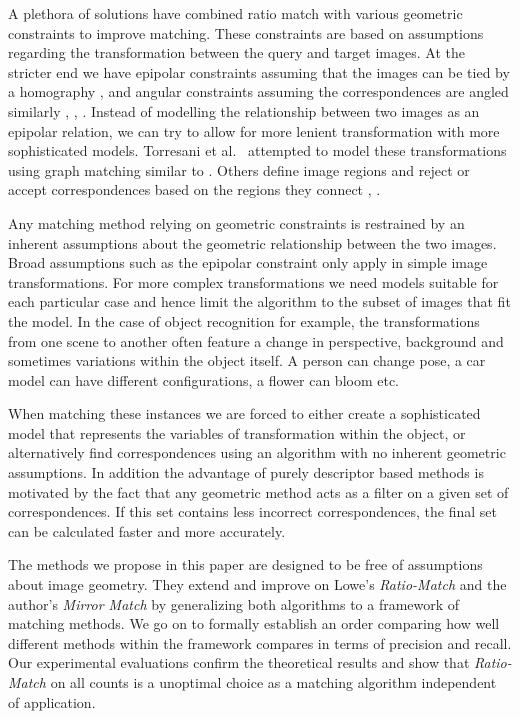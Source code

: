 \documentclass[journal]{IEEEtran}
\begin{document}
A plethora of solutions have combined ratio match with various geometric 
constraints to improve matching. These constraints are
based on assumptions regarding the transformation between the query and 
target images. At the stricter end we have epipolar constraints assuming
that the images can be tied by a homography \cite{torr2000mlesac}, 
\cite{chum2005matching} and angular constraints assuming the 
correspondences are angled similarly \cite{kim2008efficient}, 
\cite{schmid1997local}, \cite{leordeanu2005spectral}. Instead of 
modelling the relationship between two images as an epipolar relation, 
we can try to allow for more lenient transformation with more 
sophisticated models.  Torresani et al.~\cite{torresani2008feature} 
attempted to model these transformations using graph matching similar to 
\cite{deriche1994robust}. Others define image regions and reject or 
accept correspondences based on the regions they connect 
\cite{cho2009feature}, \cite{wu2011robust}.

Any matching method relying on geometric constraints is restrained by an
inherent assumptions about the geometric relationship between the two 
images. Broad assumptions such as the epipolar constraint only apply in 
simple image transformations. For more complex transformations we need 
models suitable for each particular case and hence limit the algorithm 
to the subset of images that fit the model.  In the case of object 
recognition for example, the transformations from one scene to another 
often feature a change
in perspective, background and sometimes variations within the object 
itself.  A person can change pose, a car model can have different 
configurations, a flower can bloom etc.

When matching these instances we are forced to either create a 
sophisticated model that represents the variables of transformation 
within the object, or alternatively find correspondences using an 
algorithm with no inherent geometric assumptions. In addition the 
advantage of purely descriptor based methods is motivated by the fact 
that any geometric method acts as a filter on a given set of 
correspondences.  If this set contains less incorrect correspondences, 
the final set can be calculated faster and more accurately.

The methods we propose in this paper are designed to be free of 
assumptions about image geometry. They extend and improve on Lowe's 
\emph{Ratio-Match} \cite{lowe2004sift} and the author's \emph{Mirror 
Match} \cite{arnfred2013mirror} by generalizing both algorithms to a 
framework of matching methods. We go on to formally establish an order 
comparing how well different methods within the framework compares in 
terms of precision and recall. Our experimental evaluations confirm the 
theoretical results and show that \emph{Ratio-Match} on all counts is a 
unoptimal choice as a matching algorithm independent of application.
\end{document}
